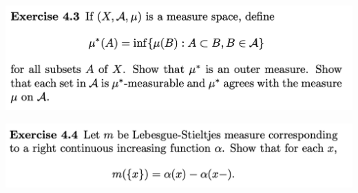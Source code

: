 \newpage
\begin{mdframed}
  \includegraphics[width=400pt]{img/analysis--berkeley-202a-hw-0d98.png}
\end{mdframed}


\newpage
\begin{mdframed}
\includegraphics[width=400pt]{img/analysis--berkeley-202a-hw04-c0b6.png}
\end{mdframed}

\newpage


